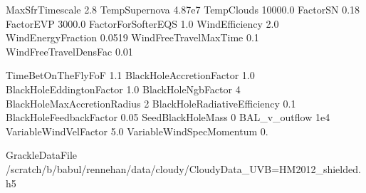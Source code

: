 MaxSfrTimescale     2.8         %
TempSupernova       4.87e7       %
TempClouds          10000.0      %
FactorSN            0.18         %
FactorEVP           3000.0      %
FactorForSofterEQS  1.0         %
WindEfficiency          2.0     %
WindEnergyFraction      0.0519  %
WindFreeTravelMaxTime   0.1     %
WindFreeTravelDensFac   0.01     %

TimeBetOnTheFlyFoF           1.1            %
BlackHoleAccretionFactor     1.0            %
BlackHoleEddingtonFactor     1.0           %
BlackHoleNgbFactor           4              %
BlackHoleMaxAccretionRadius  2              %
BlackHoleRadiativeEfficiency 0.1        %
BlackHoleFeedbackFactor      0.05           %
SeedBlackHoleMass            0
BAL_v_outflow                1e4        %
VariableWindVelFactor        5.0        %
VariableWindSpecMomentum     0.

GrackleDataFile                 /scratch/b/babul/rennehan/data/cloudy/CloudyData_UVB=HM2012_shielded.h5
